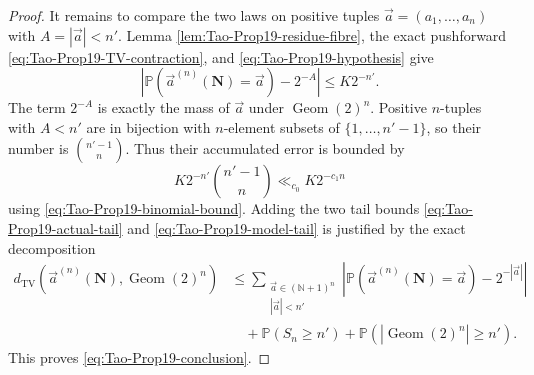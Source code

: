\begin{proof}
It remains to compare the two laws on positive tuples
\(\vec a=(a_1,\ldots,a_n)\) with \(A=|\vec a|<n'\).  Lemma
\ref{lem:Tao-Prop19-residue-fibre}, the exact pushforward
\eqref{eq:Tao-Prop19-TV-contraction}, and
\eqref{eq:Tao-Prop19-hypothesis} give
\begin{equation}
\label{eq:Tao-Prop19-point-mass}
 \left|
 \mathbb P(\vec a^{(n)}(\mathbf N)=\vec a)-2^{-A}
 \right|\leq K2^{-n'}.
\end{equation}
The term \(2^{-A}\) is exactly the mass of \(\vec a\) under
\(\operatorname{Geom}(2)^n\).  Positive \(n\)-tuples with \(A<n'\) are in
bijection with \(n\)-element subsets of \(\{1,\ldots,n'-1\}\), so their
number is \(\binom{n'-1}{n}\).  Thus their accumulated error is bounded by
\[
 K2^{-n'}\binom{n'-1}{n}\ll_{c_0}K2^{-c_1n}
\]
using \eqref{eq:Tao-Prop19-binomial-bound}.  Adding the two tail bounds
\eqref{eq:Tao-Prop19-actual-tail} and
\eqref{eq:Tao-Prop19-model-tail} is justified by the exact decomposition
\[
\begin{split}
 d_{\mathrm{TV}}\!\left(
 \vec a^{(n)}(\mathbf N),\operatorname{Geom}(2)^n\right)
 &\leq
 \sum_{\substack{\vec a\in(\mathbb N+1)^n\\|\vec a|<n'}}
 \left|\mathbb P(\vec a^{(n)}(\mathbf N)=\vec a)-2^{-|\vec a|}\right|\\
 &\quad+
 \mathbb P(S_n\geq n')
 +\mathbb P\!\left(|\operatorname{Geom}(2)^n|\geq n'\right).
\end{split}
\]
This proves \eqref{eq:Tao-Prop19-conclusion}.
\end{proof}


